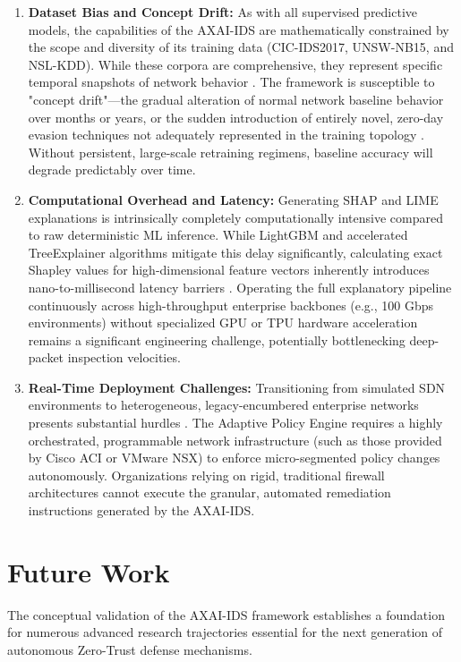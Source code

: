 \documentclass[conference]{IEEEtran}
\begin{document}
\begin{enumerate}
\item \textbf{Dataset Bias and Concept Drift:} As with all supervised predictive models, the capabilities of the AXAI-IDS are mathematically constrained by the scope and diversity of its training data (CIC-IDS2017, UNSW-NB15, and NSL-KDD). While these corpora are comprehensive, they represent specific temporal snapshots of network behavior \cite{ke2017lightgbm}. The framework is susceptible to "concept drift"—the gradual alteration of normal network baseline behavior over months or years, or the sudden introduction of entirely novel, zero-day evasion techniques not adequately represented in the training topology \cite{ahmad2020network}. Without persistent, large-scale retraining regimens, baseline accuracy will degrade predictably over time. 
\item \textbf{Computational Overhead and Latency:} Generating SHAP and LIME explanations is intrinsically completely computationally intensive compared to raw deterministic ML inference. While LightGBM and accelerated TreeExplainer algorithms mitigate this delay significantly, calculating exact Shapley values for high-dimensional feature vectors inherently introduces nano-to-millisecond latency barriers \cite{wang2021explainable}. Operating the full explanatory pipeline continuously across high-throughput enterprise backbones (e.g., 100 Gbps environments) without specialized GPU or TPU hardware acceleration remains a significant engineering challenge, potentially bottlenecking deep-packet inspection velocities.
\item \textbf{Real-Time Deployment Challenges:} Transitioning from simulated SDN environments to heterogeneous, legacy-encumbered enterprise networks presents substantial hurdles \cite{lundberg2017unified}. The Adaptive Policy Engine requires a highly orchestrated, programmable network infrastructure (such as those provided by Cisco ACI or VMware NSX) to enforce micro-segmented policy changes autonomously. Organizations relying on rigid, traditional firewall architectures cannot execute the granular, automated remediation instructions generated by the AXAI-IDS. 
\end{enumerate}

\section{Future Work}

The conceptual validation of the AXAI-IDS framework establishes a foundation for numerous advanced research trajectories essential for the next generation of autonomous Zero-Trust defense mechanisms. 
\end{document}
